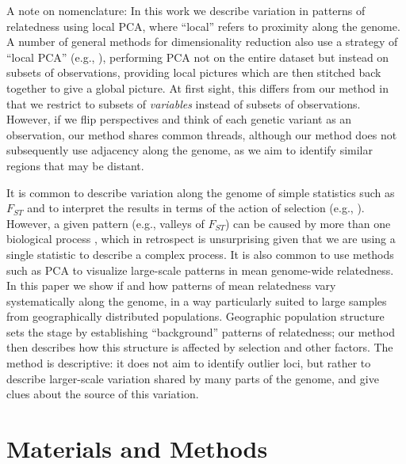 \documentclass[11pt, oneside]{article}   	%
\newcommand\citet{\cite}
\newcommand\citep{\cite}
\renewcommand{\revpoint}[2]{\relax}
\renewcommand{\llabel}[1]{\relax}
\begin{document}
A note on nomenclature: In this work we describe variation in patterns of relatedness using local PCA,
where ``local'' refers to proximity along the genome.
A number of general methods for dimensionality reduction also use a strategy of ``local PCA''
(e.g., \citet{manjon2013diffusion,kambhatla1997dimension,weingessel2000local,roweis2000nonlinear}),
performing PCA not on the entire dataset but instead on subsets of observations,
providing local pictures which are then stitched back together to give a global picture.
At first sight,
this differs from our method in that we restrict to subsets of \emph{variables} instead of subsets of observations.
However, if we flip perspectives and think of each genetic variant as an observation,
our method shares common threads, although 
our method does not subsequently use adjacency along the genome,
as we aim to identify similar regions that may be distant.

It is common to describe variation along the genome of simple statistics such as $F_{ST}$
and to interpret the results in terms of the action of selection 
(e.g., \citet{turner2005genomic,ellegren2012genomic}).
However, a given pattern (e.g., valleys of $F_{ST}$)
can be caused by more than one biological process \citep{cruickshank2014reanalysis,burri2015linked},
which in retrospect is unsurprising given that we are using a single statistic
to describe a complex process.
It is also common to use methods such as PCA to visualize large-scale patterns in 
mean genome-wide relatedness.
In this paper we show if and how patterns of mean relatedness vary systematically along the genome, 
in a way particularly suited to large samples from geographically distributed populations.
Geographic population structure sets the stage by establishing ``background'' patterns of relatedness;
our method then describes how this structure is affected by selection and other factors.
The method is descriptive:
it does not aim to identify outlier loci,
but rather to describe larger-scale variation shared by many parts of the genome,
and give clues about the source of this variation. \llabel{ll:descriptive}



\section{Materials and Methods}
\end{document}
